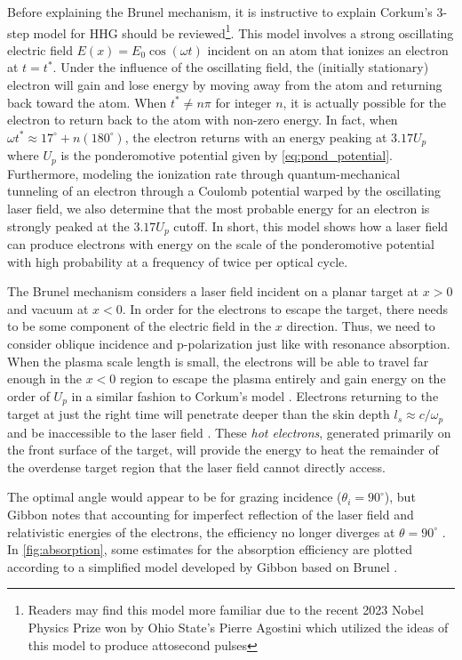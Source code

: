 Before explaining the Brunel mechanism, it is instructive to explain Corkum's 3-step model for \gls{HHG} \cite{Corkum_1993_PRL} should be reviewed\footnote{Readers may find this model more familiar due to the recent 2023 Nobel Physics Prize won by Ohio State's Pierre Agostini \cite{Nobel_2023} which utilized the ideas of this model to produce attosecond pulses}. This model involves a strong oscillating electric field $E(x) = E_0 \cos(\omega t)$ incident on an atom that ionizes an electron at $t = t^*$. Under the influence of the oscillating field, the (initially stationary) electron will gain  and lose energy by moving away from the atom and returning back toward the atom. When $t^* \neq n \pi$ for integer $n$, it is actually possible for the electron to return back to the atom with non-zero energy. In fact, when $\omega t^* \approx 17^\circ + n (180^\circ)$, the electron returns with an energy peaking at $3.17 U_p$ where $U_p$ is the ponderomotive potential given by \cref{eq:pond_potential}. Furthermore, modeling the ionization rate through quantum-mechanical tunneling of an electron through a Coulomb potential warped by the oscillating laser field, we also determine that the most probable energy for an electron is strongly peaked at the $3.17 U_p$ cutoff. In short, this model shows how a laser field can produce electrons with energy on the scale of the ponderomotive potential with high probability at a frequency of twice per optical cycle. 

The Brunel mechanism \cite{Brunel_1987_PRL} considers a laser field incident on a planar target at $x > 0$ and vacuum at $x < 0$. In order for the electrons to escape the target, there needs to be some component of the electric field in the $x$ direction. Thus, we need to consider oblique incidence and p-polarization just like with resonance absorption. When the plasma scale length is small, the electrons will be able to travel far enough in the $x < 0$ region to escape the plasma entirely and gain energy on the order of $U_p$ in a similar fashion to Corkum's model \cite{Corkum_1993_PRL}. Electrons returning to the target at just the right time will penetrate deeper than the skin depth $l_s \approx c / \omega_p$ and be inaccessible to the laser field \cite{Gibbon_2005_Plasma}. These \emph{hot electrons}, generated primarily on the front surface of the target, will provide the energy to heat the remainder of the overdense target region that the laser field cannot directly access. 

The optimal angle would appear to be for grazing incidence ($\theta_i = 90^\circ$), but Gibbon notes that accounting for imperfect reflection of the laser field and relativistic energies of the electrons, the efficiency no longer diverges at $\theta = 90^\circ$ \cite{Gibbon_2005_Plasma}. In \cref{fig:absorption}, some estimates for the absorption efficiency are plotted according to a simplified model developed by Gibbon \cite{Gibbon_2005_Plasma} based on Brunel \cite{Brunel_1987_PRL}.

